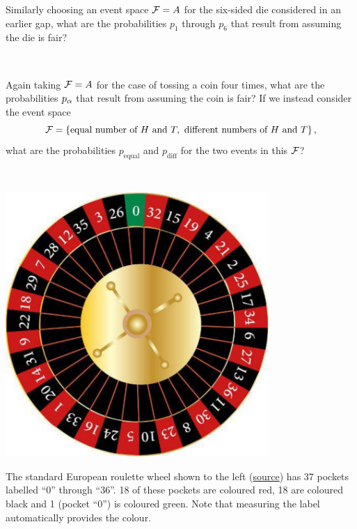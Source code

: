 Similarly choosing an event space $\mathcal F = A$ for the six-sided die considered in an earlier gap, what are the probabilities $p_1$ through $p_6$ that result from assuming the die is fair?
\begin{mdframed}
  \ \\[100 pt]
\end{mdframed}
Again taking $\mathcal F = A$ for the case of tossing a coin four times, what are the probabilities $p_{\alpha}$ that result from assuming the coin is fair?
If we instead consider the event space
\begin{equation*}
  \mathcal F = \left\{\mbox{equal number of } H \mbox{ and } T, \mbox{ different numbers of } H \mbox{ and } T\right\},
\end{equation*}
what are the probabilities $p_{\text{equal}}$ and $p_{\text{diff}}$ for the two events in this $\mathcal F$?
\begin{mdframed}
  \ \\[100 pt]
\end{mdframed}

\begin{minipage}{0.4\textwidth}
  \includegraphics[width=0.75\textwidth]{figs/unit01_roulette.pdf}
\end{minipage}%
\begin{minipage}{0.5\textwidth}
  The standard European roulette wheel shown to the left (\href{https://www.vecteezy.com/vector-art/658761-casino-roulette-wheel}{source}) has 37 pockets labelled ``0'' through ``36''.
  18 of these pockets are coloured red, 18 are coloured black and 1 (pocket ``0'') is coloured green.
  Note that measuring the label automatically provides the colour.
\end{minipage}

